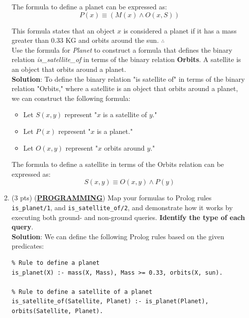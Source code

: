 \documentclass[12pt]{article}
\begin{document}
\begin{spacing}{1.5}
\begin{enumerate}
\begin{itemize}
		      \end{itemize}

		      The formula to define a planet can be expressed as:
		      $$P(x)\equiv (M(x) \land O(x, S))$$

		      This formula states that an object $x$ is considered a planet if it has a mass greater than 0.33 KG and orbits around the sun. $\therefore$ \\

		      Use the formula for \textit{Planet} to construct a formula that defines the binary relation
		      \textit{is\_satellite\_of} in terms of the binary relation \textbf{Orbits}. A satellite is an object that orbits around a planet.\\

		      \textbf{Solution}: To define the binary relation "is satellite of" in terms of the binary relation "Orbits," where a satellite is an object that orbits around a planet, we can construct the following formula:

		      \begin{itemize}
		      	
		      	\item Let $S(x,y)$ represent "$x$ is a satellite of $y$."
		      	\item Let $P(x)$ represent "$x$ is a planet."
		      	\item Let $O(x,y)$ represent "$x$ orbits around $y$."
		      	      
		      \end{itemize}

		      The formula to define a satellite in terms of the Orbits relation can be expressed as:
		      $$S(x,y) \equiv O(x,y) \land P(y)$$
		      		      		              
		\item 
		      (3 pts) (\uline{\textbf{PROGRAMMING}}) Map your formulas to Prolog rules \texttt{is\_planet/1}, and
		      \texttt{is\_satellite\_of/2}, and demonstrate how it works by executing both ground- and
		      non-ground queries. \textbf{Identify the type of each query}.\\

		      \textbf{Solution}: We can define the following Prolog rules based on the given predicates:

		      \begin{lstlisting}
% Rule to define a planet
is_planet(X) :- mass(X, Mass), Mass >= 0.33, orbits(X, sun).

% Rule to define a satellite of a planet
is_satellite_of(Satellite, Planet) :- is_planet(Planet), orbits(Satellite, Planet).       
		      \end{lstlisting}


\end{enumerate}
\end{spacing}
\end{document}
